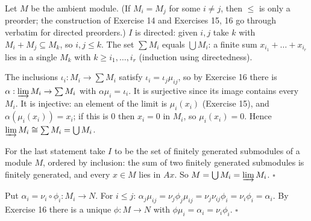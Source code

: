 \documentclass[11pt]{article}
\begin{document}
\pf
Let $M$ be the ambient module. (If $M_i=M_j$ for some $i\ne j$, then $\le$ is only a preorder; the construction of Exercise 14 and Exercises 15, 16 go through verbatim for directed preorders.) $I$ is directed: given $i,j$ take $k$ with $M_i+M_j\subseteq M_k$, so $i,j\le k$. The set $\sum M_i$ equals $\bigcup M_i$: a finite sum $x_{i_1}+\dots+x_{i_r}$ lies in a single $M_k$ with $k\ge i_1,\dots,i_r$ (induction using directedness).

The inclusions $\iota_i:M_i\to\sum M_i$ satisfy $\iota_i=\iota_j\mu_{ij}$, so by Exercise 16 there is $\alpha:\varinjlim M_i\to\sum M_i$ with $\alpha\mu_i=\iota_i$. It is surjective since its image contains every $M_i$. It is injective: an element of the limit is $\mu_i(x_i)$ (Exercise 15), and $\alpha(\mu_i(x_i))=x_i$; if this is $0$ then $x_i=0$ in $M_i$, so $\mu_i(x_i)=0$. Hence $\varinjlim M_i\cong\sum M_i=\bigcup M_i$.

For the last statement take $I$ to be the set of finitely generated submodules of a module $M$, ordered by inclusion: the sum of two finitely generated submodules is finitely generated, and every $x\in M$ lies in $Ax$. So $M=\bigcup M_i=\varinjlim M_i$. \hfill$\square$

\pf
Put $\alpha_i=\nu_i\circ\phi_i:M_i\to N$. For $i\le j$: $\alpha_j\mu_{ij}=\nu_j\phi_j\mu_{ij}=\nu_j\nu_{ij}\phi_i=\nu_i\phi_i=\alpha_i$. By Exercise 16 there is a unique $\phi:M\to N$ with $\phi\mu_i=\alpha_i=\nu_i\phi_i$. \hfill$\square$
\end{document}
